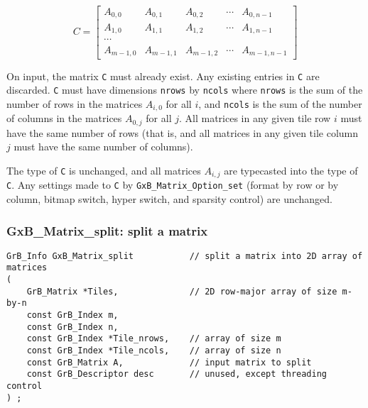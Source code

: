 \documentclass[12pt]{article}
\begin{document}
\[
C =
\left[
\begin{array}{ccccc}
          A_{0,0}   & A_{0,1}   & A_{0,2}   & \cdots & A_{0,n-1}   \\
          A_{1,0}   & A_{1,1}   & A_{1,2}   & \cdots & A_{1,n-1}   \\
          \cdots    &                                              \\
          A_{m-1,0} & A_{m-1,1} & A_{m-1,2} & \cdots & A_{m-1,n-1}
\end{array}
\right]
\]

On input, the matrix \verb'C' must already exist.  Any existing entries in
\verb'C' are discarded.  \verb'C' must have dimensions \verb'nrows' by
\verb'ncols' where \verb'nrows' is the sum of the number of rows in the
matrices $A_{i,0}$ for all $i$, and \verb'ncols' is the sum of the number of
columns in the matrices $A_{0,j}$ for all $j$.  All matrices in any given tile
row $i$ must have the same number of rows (that is, and all matrices in any
given tile column $j$ must have the same number of columns).

The type of \verb'C' is unchanged, and all matrices $A_{i,j}$ are typecasted
into the type of \verb'C'.  Any settings made to \verb'C' by
\verb'GxB_Matrix_Option_set' (format by row or by column, bitmap switch, hyper
switch, and sparsity control) are unchanged.

\subsubsection{{\sf GxB\_Matrix\_split:} split a matrix   }
\label{matrix_split}

\begin{mdframed}[userdefinedwidth=6in]
{\footnotesize
\begin{verbatim}
GrB_Info GxB_Matrix_split           // split a matrix into 2D array of matrices
(
    GrB_Matrix *Tiles,              // 2D row-major array of size m-by-n
    const GrB_Index m,
    const GrB_Index n,
    const GrB_Index *Tile_nrows,    // array of size m
    const GrB_Index *Tile_ncols,    // array of size n
    const GrB_Matrix A,             // input matrix to split
    const GrB_Descriptor desc       // unused, except threading control
) ;
\end{verbatim} } \end{mdframed}
\end{document}
